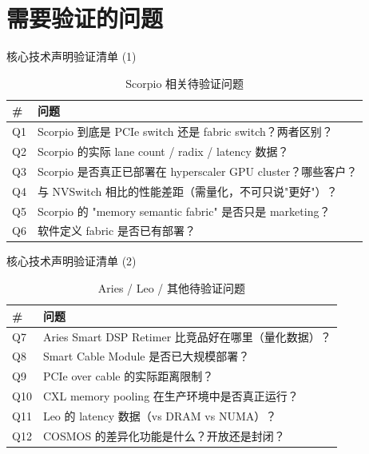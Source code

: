 \documentclass[UTF8,11pt,aspectratio=169]{beamer}
\begin{document}
\section{需要验证的问题}

\begin{frame}{核心技术声明验证清单 (1)}
    \begin{table}
        \centering
        \caption{Scorpio 相关待验证问题}
        \begin{tabular}{lp{}}
            \toprule
            \textbf{\#} & \textbf{问题} \\
            \midrule
            Q1 & Scorpio 到底是 PCIe switch 还是 fabric switch？两者区别？\\
            Q2 & Scorpio 的实际 lane count / radix / latency 数据？\\
            Q3 & Scorpio 是否真正已部署在 hyperscaler GPU cluster？哪些客户？\\
            Q4 & 与 NVSwitch 相比的性能差距（需量化，不可只说"更好"）？\\
            Q5 & Scorpio 的 "memory semantic fabric" 是否只是 marketing？\\
            Q6 & 软件定义 fabric 是否已有部署？\\
            \bottomrule
        \end{tabular}
    \end{table}
\end{frame}

\begin{frame}{核心技术声明验证清单 (2)}
    \begin{table}
        \centering
        \caption{Aries / Leo / 其他待验证问题}
        \begin{tabular}{lp{}}
            \toprule
            \textbf{\#} & \textbf{问题} \\
            \midrule
            Q7 & Aries Smart DSP Retimer 比竞品好在哪里（量化数据）？\\
            Q8 & Smart Cable Module 是否已大规模部署？\\
            Q9 & PCIe over cable 的实际距离限制？\\
            Q10 & CXL memory pooling 在生产环境中是否真正运行？\\
            Q11 & Leo 的 latency 数据（vs DRAM vs NUMA）？\\
            Q12 & COSMOS 的差异化功能是什么？开放还是封闭？\\
            \bottomrule
        \end{tabular}
    \end{table}
\end{frame}
\end{document}
